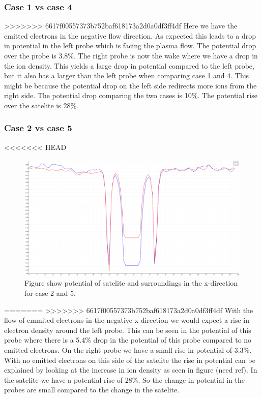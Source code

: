 \subsubsection{Case 1 vs case 4}

>>>>>>> 6617f00557373b752baf618173a2d0a0df3ff4df
Here we have the emitted electrons in the negative flow direction. As expected this
leads to a drop in potential in the left probe which is facing the plasma flow. The
potential drop over the probe is 3.8\%. The right probe is now the wake where we have
a drop in the ion density. This yields a large drop in potential compared to the left
probe, but it also has a larger than the left probe when comparing case 1 and 4. This
might be because the potential drop on the left side redirects more ions from the right side.
The potential drop comparing the two cases is 10\%. The potential rise over the satelite is 28\%.


\subsubsection{Case 2 vs case 5}

<<<<<<< HEAD
\begin{figure}
    \includegraphics[scale = 0.5 \textwidth]{images/pot_case25.png}
    \caption{Figure show potential of satelite and surroundings in the x-direction for case 2 and 5.}
\end{figure}

=======
>>>>>>> 6617f00557373b752baf618173a2d0a0df3ff4df
With the flow of emmited electrons in the negative x direction we would expect a rise in electron density around the left probe.
This can be seen in the potential of this probe where there is a 5.4\% drop in the potential of this probe compared to no emitted
electrons. On the right probe we have a small rise in potential of 3.3\%. With no emitted electrons on this side of the satelite the rise in
potential can be explained by looking at the increase in ion density as seen in figure (need ref).
In the satelite we have a potential rise of 28\%. So the change in potential in the probes are small compared to the change in the satelite.

